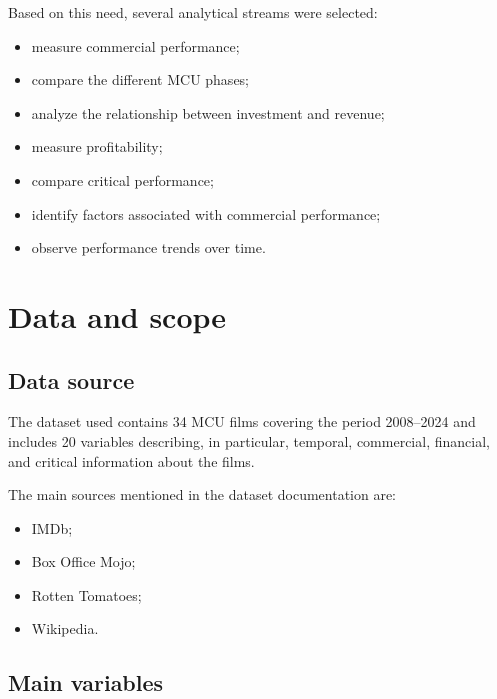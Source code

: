 \documentclass[a4paper,11pt]{article}
\begin{document}
Based on this need, several analytical streams were selected:
\begin{itemize}
  \item measure commercial performance;
  \item compare the different MCU phases;
  \item analyze the relationship between investment and revenue;
  \item measure profitability;
  \item compare critical performance;
  \item identify factors associated with commercial performance;
  \item observe performance trends over time.
\end{itemize}

\section{Data and scope}

\subsection{Data source}

The dataset used contains 34 MCU films covering the period 2008--2024 and
includes 20 variables describing, in particular, temporal, commercial,
financial, and critical information about the films.

The main sources mentioned in the dataset documentation are:
\begin{itemize}
  \item IMDb;
  \item Box Office Mojo;
  \item Rotten Tomatoes;
  \item Wikipedia.
\end{itemize}

\subsection{Main variables}
\end{document}
